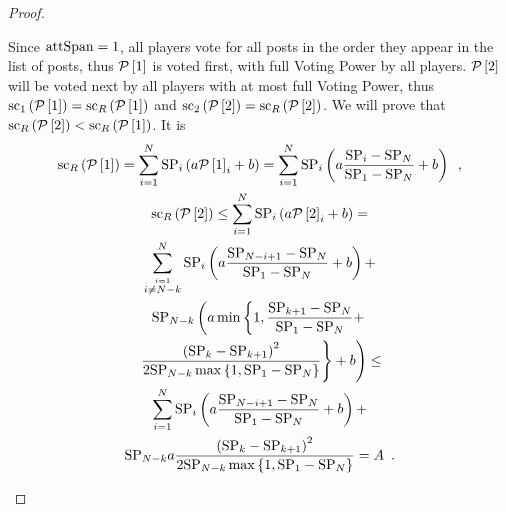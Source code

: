 \begin{proof}
\begin{itemize}
    Since $\mathrm{attSpan} = 1$, all players vote for all posts in the order they
    appear in the list of posts, thus $\mathcal{P}\left[1\right]$ is voted first,
    with full Voting Power by all players. $\mathcal{P}\left[2\right]$ will be
    voted next by all players with at most full Voting Power, thus
    $\mathrm{sc}_1\left(\mathcal{P}\left[1\right]\right) =
    \mathrm{sc}_R\left(\mathcal{P}\left[1\right]\right)$ and
    $\mathrm{sc}_2\left(\mathcal{P}\left[2\right]\right) =
    \mathrm{sc}_R\left(\mathcal{P}\left[2\right]\right)$. We will prove that
    $\mathrm{sc}_R\left(\mathcal{P}\left[2\right]\right) <
    \mathrm{sc}_R\left(\mathcal{P}\left[1\right]\right)$. It is
    \begin{gather*}
      \mathrm{sc}_R\left(\mathcal{P}\left[1\right]\right) = \sum\limits_{i =
      1}^N \mathrm{SP}_i\left(a \mathcal{P}\left[1\right]_i + b\right) =
      \sum\limits_{i = 1}^N \mathrm{SP}_i\left(a \frac{\mathrm{SP}_i -
      \mathrm{SP}_N}{\mathrm{SP}_1 - \mathrm{SP}_N} + b\right) \enspace, \\
      \mathrm{sc}_R\left(\mathcal{P}\left[2\right]\right) \leq
      \sum\limits_{i = 1}^N \mathrm{SP}_i\left(a \mathcal{P}\left[2\right]_i +
      b\right) = \\
      \sum\limits_{\overset{i = 1}{i \neq N - k}}^N
      \mathrm{SP}_i\left(a \frac{\mathrm{SP}_{N - i + 1} -
      \mathrm{SP}_N}{\mathrm{SP}_1 - \mathrm{SP}_N} + b\right) + \\
      \mathrm{SP}_{N - k}\left(a \min\left\{1, \frac{\mathrm{SP}_{k + 1} -
      \mathrm{SP}_N}{\mathrm{SP}_1 - \mathrm{SP}_N} + \right.\right. \\
      \left.\left. \frac{\left(\mathrm{SP}_k -
      \mathrm{SP}_{k+1}\right)^2}{2\mathrm{SP}_{N - k}\max{\left\{1, \mathrm{SP}_1 -
      \mathrm{SP}_N\right\}}}\right\} + b\right) \leq \\
      \sum\limits_{i = 1}^N \mathrm{SP}_i\left(a \frac{\mathrm{SP}_{N -
      i + 1} - \mathrm{SP}_N}{\mathrm{SP}_1 - \mathrm{SP}_N} + b\right) + \\
      \mathrm{SP}_{N - k} a \frac{\left(\mathrm{SP}_k -
      \mathrm{SP}_{k+1}\right)^2}{2\mathrm{SP}_{N - k}\max{\left\{1, \mathrm{SP}_1 -
      \mathrm{SP}_N\right\}}} = A \enspace.
    \end{gather*}


\end{itemize}
\end{proof}
